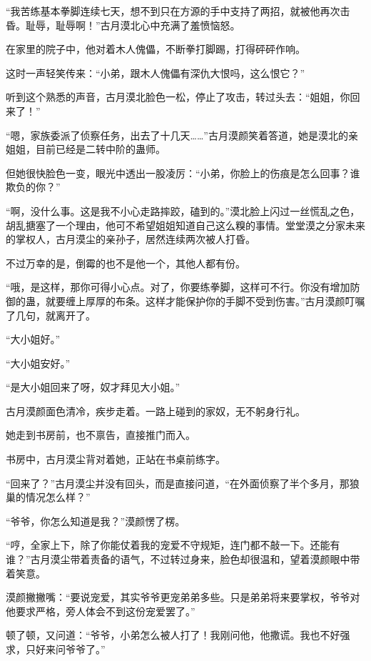 
\begin{this_body}

“我苦练基本拳脚连续七天，想不到只在方源的手中支持了两招，就被他再次击昏。耻辱，耻辱啊！”古月漠北心中充满了羞愤恼怒。

在家里的院子中，他对着木人傀儡，不断拳打脚踢，打得砰砰作响。

这时一声轻笑传来：“小弟，跟木人傀儡有深仇大恨吗，这么恨它？”

听到这个熟悉的声音，古月漠北脸色一松，停止了攻击，转过头去：“姐姐，你回来了！”

“嗯，家族委派了侦察任务，出去了十几天……”古月漠颜笑着答道，她是漠北的亲姐姐，目前已经是二转中阶的蛊师。

但她很快脸色一变，眼光中透出一股凌厉：“小弟，你脸上的伤痕是怎么回事？谁欺负的你？”

“啊，没什么事。这是我不小心走路摔跤，磕到的。”漠北脸上闪过一丝慌乱之色，胡乱搪塞了一个理由，他可不希望姐姐知道自己这么糗的事情。堂堂漠之分家未来的掌权人，古月漠尘的亲孙子，居然连续两次被人打昏。

不过万幸的是，倒霉的也不是他一个，其他人都有份。

“哦，是这样，那你可得小心点。对了，你要练拳脚，这样可不行。你没有增加防御的蛊，就要缠上厚厚的布条。这样才能保护你的手脚不受到伤害。”古月漠颜叮嘱了几句，就离开了。

“大小姐好。”

“大小姐安好。”

“是大小姐回来了呀，奴才拜见大小姐。”

古月漠颜面色清冷，疾步走着。一路上碰到的家奴，无不躬身行礼。

她走到书房前，也不禀告，直接推门而入。

书房中，古月漠尘背对着她，正站在书桌前练字。

“回来了？”古月漠尘并没有回头，而是直接问道，“在外面侦察了半个多月，那狼巢的情况怎么样？”

“爷爷，你怎么知道是我？”漠颜愣了楞。

“哼，全家上下，除了你能仗着我的宠爱不守规矩，连门都不敲一下。还能有谁？”古月漠尘带着责备的语气，不过转过身来，脸色却很温和，望着漠颜眼中带着笑意。

漠颜撇撇嘴：“要说宠爱，其实爷爷更宠弟弟多些。只是弟弟将来要掌权，爷爷对他要求严格，旁人体会不到这份宠爱罢了。”

顿了顿，又问道：“爷爷，小弟怎么被人打了！我刚问他，他撒谎。我也不好强求，只好来问爷爷了。”


\end{this_body}

